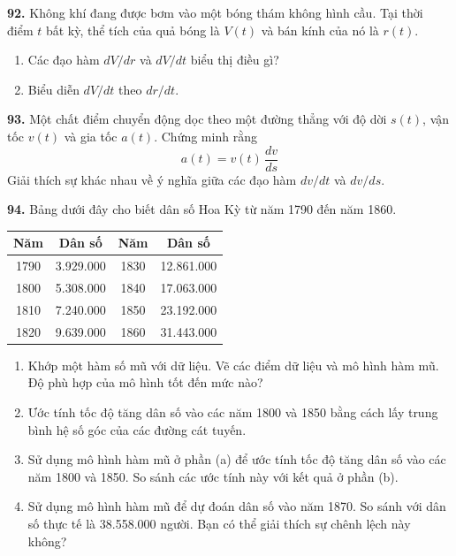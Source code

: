 \begin{minipage}[t]{0.485\textwidth}
\vspace{8pt}
\noindent
\textbf{92.} Không khí đang được bơm vào một bóng thám không hình cầu. Tại thời điểm $t$ bất kỳ, thể tích của quả bóng là $V(t)$ và bán kính của nó là $r(t)$.
\begin{enumerate}[label=(\alph*), leftmargin=*, itemsep=1pt, topsep=2pt]
  \item Các đạo hàm $dV/dr$ và $dV/dt$ biểu thị điều gì?
  \item Biểu diễn $dV/dt$ theo $dr/dt$.
\end{enumerate}
\end{minipage}%
\hfill
\begin{minipage}[t]{0.485\textwidth}
\textbf{93.} Một chất điểm chuyển động dọc theo một đường thẳng với độ dời $s(t)$, vận tốc $v(t)$ và gia tốc $a(t)$. Chứng minh rằng
\[
a(t) = v(t)\,\frac{dv}{ds}
\]
Giải thích sự khác nhau về ý nghĩa giữa các đạo hàm $dv/dt$ và $dv/ds$.

\vspace{8pt}
\noindent
\textbf{94.} Bảng dưới đây cho biết dân số Hoa Kỳ từ năm 1790 đến năm 1860.
\begin{center}
\renewcommand{\arraystretch}{1.15}
\small
\begin{tabular}{|c|c||c|c|}
\hline
\rowcolor{tableheaderblue}
\textbf{Năm} & \textbf{Dân số} & \textbf{Năm} & \textbf{Dân số} \\
\hline
1790 & 3.929.000 & 1830 & 12.861.000 \\
1800 & 5.308.000 & 1840 & 17.063.000 \\
1810 & 7.240.000 & 1850 & 23.192.000 \\
1820 & 9.639.000 & 1860 & 31.443.000 \\
\hline
\end{tabular}
\end{center}
\begin{enumerate}[label=(\alph*), leftmargin=*, itemsep=1pt, topsep=2pt]
  \item[\llap{\techicon\enspace}(a)] Khớp một hàm số mũ với dữ liệu. Vẽ các điểm dữ liệu và mô hình hàm mũ. Độ phù hợp của mô hình tốt đến mức nào?
  \item Ước tính tốc độ tăng dân số vào các năm 1800 và 1850 bằng cách lấy trung bình hệ số góc của các đường cát tuyến.
  \item Sử dụng mô hình hàm mũ ở phần (a) để ước tính tốc độ tăng dân số vào các năm 1800 và 1850. So sánh các ước tính này với kết quả ở phần (b).
  \item Sử dụng mô hình hàm mũ để dự đoán dân số vào năm 1870. So sánh với dân số thực tế là 38.558.000 người. Bạn có thể giải thích sự chênh lệch này không?
\end{enumerate}


\end{minipage}
